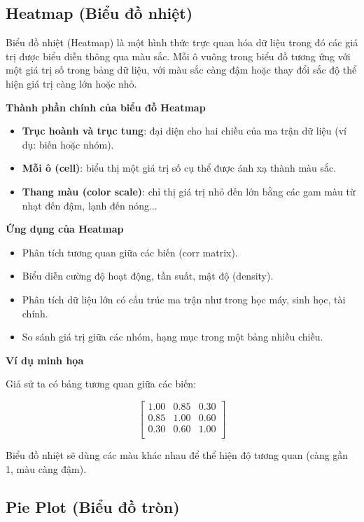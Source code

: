 \subsection{Heatmap (Biểu đồ nhiệt)}
\label{graph:heatmap}

Biểu đồ nhiệt (Heatmap) là một hình thức trực quan hóa dữ liệu trong đó các giá trị được biểu diễn thông qua màu sắc. Mỗi ô vuông trong biểu đồ tương ứng với một giá trị số trong bảng dữ liệu, với màu sắc càng đậm hoặc thay đổi sắc độ thể hiện giá trị càng lớn hoặc nhỏ.

\textbf{Thành phần chính của biểu đồ Heatmap}

\begin{itemize}
    \item \textbf{Trục hoành và trục tung}: đại diện cho hai chiều của ma trận dữ liệu (ví dụ: biến hoặc nhóm).
    \item \textbf{Mỗi ô (cell)}: biểu thị một giá trị số cụ thể được ánh xạ thành màu sắc.
    \item \textbf{Thang màu (color scale)}: chỉ thị giá trị nhỏ đến lớn bằng các gam màu từ nhạt đến đậm, lạnh đến nóng...
\end{itemize}

\textbf{Ứng dụng của Heatmap}

\begin{itemize}
    \item Phân tích tương quan giữa các biến (corr matrix).
    \item Biểu diễn cường độ hoạt động, tần suất, mật độ (density).
    \item Phân tích dữ liệu lớn có cấu trúc ma trận như trong học máy, sinh học, tài chính.
    \item So sánh giá trị giữa các nhóm, hạng mục trong một bảng nhiều chiều.
\end{itemize}

\textbf{Ví dụ minh họa}

Giả sử ta có bảng tương quan giữa các biến:

\[
\begin{bmatrix}
1.00 & 0.85 & 0.30 \\
0.85 & 1.00 & 0.60 \\
0.30 & 0.60 & 1.00 \\
\end{bmatrix}
\]

Biểu đồ nhiệt sẽ dùng các màu khác nhau để thể hiện độ tương quan (càng gần 1, màu càng đậm).


\subsection{Pie Plot (Biểu đồ tròn)}
\label{graph:pie}

